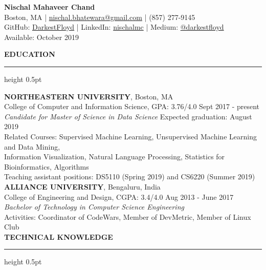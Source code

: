 \documentclass[a4paper]{article}
\newcommand{\myline}{\par
  \kern2pt %
  \hrule height 0.5pt
  \kern2pt %
}
\begin{document}
	\begin{center}
		{\Large \textbf{Nischal Mahaveer Chand}} \\
    Boston, MA | \href{mailto:nischal.bhatewara@gmail.com}{nischal.bhatewara@gmail.com} | 
    (857) 277-9145 \\
                GitHub: \href{https://github.com/DarkestFloyd}{DarkestFloyd} | 
                LinkedIn: \href{https://www.linkedin.com/in/nischalmc}{nischalmc} |
		Medium: \href{https://medium.com/@darkestfloyd}{@darkestfloyd} \\
		Available: October 2019 \\
	\end{center}
	
	\noindent
	{\large \textbf{EDUCATION}}
	\myline 
	\smallskip
	
	\noindent
	\textbf{NORTHEASTERN UNIVERSITY}, Boston, MA \\
	College of Computer and Information Science, GPA: 3.76/4.0 
        \hfill Sept 2017 - present \\
	\textit{Candidate for Master of Science in Data Science} 
        \hfill Expected graduation: August 2019 \\
        Related Courses: Supervised Machine Learning, 
        Unsupervised Machine Learning and Data Mining, \\
        \hspace*{23.9mm} Information Visualization,
        Natural Language Processing, 
        Statistics for Bioinformatics, Algorithms \\
  Teaching assistant positions: DS5110 (Spring 2019) and CS6220 (Summer 2019) \\

	\noindent
	\textbf{ALLIANCE UNIVERSITY}, Bengaluru, India \\
  College of Engineering and Design, CGPA: 3.4/4.0 \hfill Aug 2013 - June 2017 \\
	\textit{Bachelor of Technology in Computer Science Engineering} \\
	Activities: Coordinator of CodeWars, Member of DevMetric, Member of Linux 
        Club \\
	
	\noindent
	{\large \textbf{TECHNICAL KNOWLEDGE}}
	\myline 
	
\end{document}
